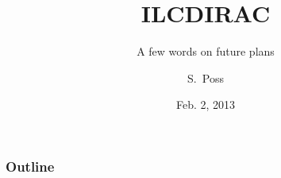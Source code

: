 \documentclass[10pt,table,dvipsnames]{beamer}
\author{S.~Poss}
\title{ILCDIRAC}
\subtitle{A few words on future plans}
\date{Feb. 2, 2013}
\institute{CERN, LAPP}
\begin{document}
\renewcommand{\inserttotalframenumber}{\ref{lastframe}}

\begin{frame}
\titlepage
\end{frame}

\begin{frame}
\frametitle{Outline}
\tableofcontents
\end{frame}

%
\end{document}
